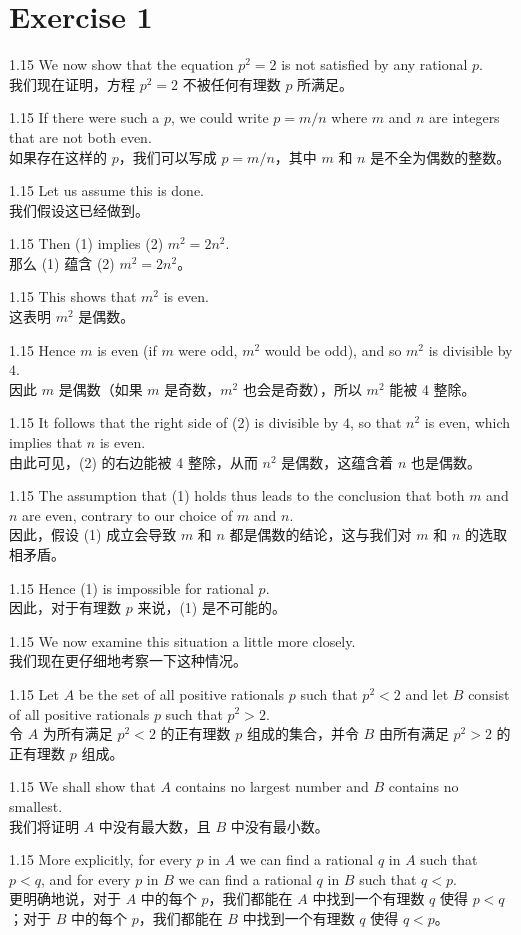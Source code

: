 \documentclass[12pt,a4paper]{article}
\newcommand{\bilingual}[2]{
    \begin{spacing}{1.15} %
        \noindent \normalsize #1 \\[-0.5ex] %
        \small \textcolor{blue!70!black}{#2} %
    \end{spacing}
    \vspace{0.8em} %
}
\begin{document}
\section*{Exercise 1}

\bilingual{We now show that the equation $p^{2}=2$ is not satisfied by any rational $p$.}{我们现在证明，方程 $p^{2}=2$ 不被任何有理数 $p$ 所满足。}

\bilingual{If there were such a $p$, we could write $p=m/n$ where $m$ and $n$ are integers that are not both even.}{如果存在这样的 $p$，我们可以写成 $p=m/n$，其中 $m$ 和 $n$ 是不全为偶数的整数。}

\bilingual{Let us assume this is done.}{我们假设这已经做到。}

\bilingual{Then (1) implies (2) $m^{2}=2n^{2}$.}{那么 (1) 蕴含 (2) $m^{2}=2n^{2}$。}

\bilingual{This shows that $m^{2}$ is even.}{这表明 $m^{2}$ 是偶数。}

\bilingual{Hence $m$ is even (if $m$ were odd, $m^{2}$ would be odd), and so $m^{2}$ is divisible by $4$.}{因此 $m$ 是偶数（如果 $m$ 是奇数，$m^{2}$ 也会是奇数），所以 $m^{2}$ 能被 4 整除。}

\bilingual{It follows that the right side of (2) is divisible by $4$, so that $n^{2}$ is even, which implies that $n$ is even.}{由此可见，(2) 的右边能被 4 整除，从而 $n^{2}$ 是偶数，这蕴含着 $n$ 也是偶数。}

\bilingual{The assumption that (1) holds thus leads to the conclusion that both $m$ and $n$ are even, contrary to our choice of $m$ and $n$.}{因此，假设 (1) 成立会导致 $m$ 和 $n$ 都是偶数的结论，这与我们对 $m$ 和 $n$ 的选取相矛盾。}

\bilingual{Hence (1) is impossible for rational $p$.}{因此，对于有理数 $p$ 来说，(1) 是不可能的。}

\bilingual{We now examine this situation a little more closely.}{我们现在更仔细地考察一下这种情况。}

\bilingual{Let $A$ be the set of all positive rationals $p$ such that $p^{2}<2$ and let $B$ consist of all positive rationals $p$ such that $p^{2}>2$.}{令 $A$ 为所有满足 $p^{2}<2$ 的正有理数 $p$ 组成的集合，并令 $B$ 由所有满足 $p^{2}>2$ 的正有理数 $p$ 组成。}

\bilingual{We shall show that $A$ contains no largest number and $B$ contains no smallest.}{我们将证明 $A$ 中没有最大数，且 $B$ 中没有最小数。}

\bilingual{More explicitly, for every $p$ in $A$ we can find a rational $q$ in $A$ such that $p<q$, and for every $p$ in $B$ we can find a rational $q$ in $B$ such that $q<p$.}{更明确地说，对于 $A$ 中的每个 $p$，我们都能在 $A$ 中找到一个有理数 $q$ 使得 $p<q$；对于 $B$ 中的每个 $p$，我们都能在 $B$ 中找到一个有理数 $q$ 使得 $q<p$。}
\end{document}

